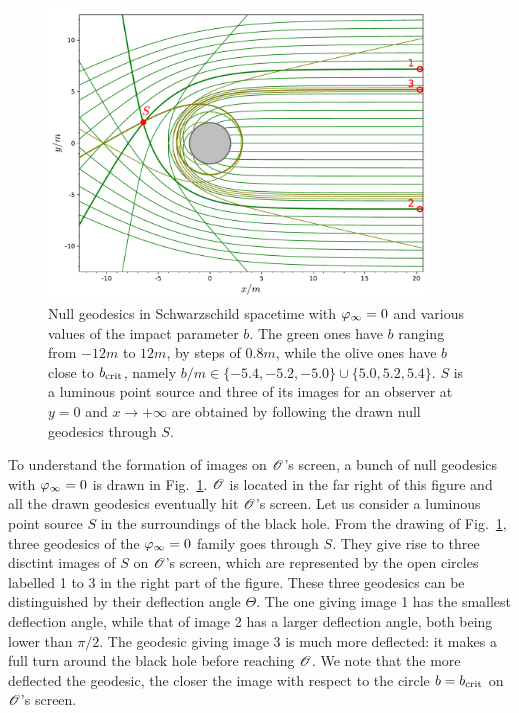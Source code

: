 \begin{figure}
\centerline{\includegraphics[width=0.9\textwidth]{ges_mult_images.pdf}}
\caption[]{\label{f:gis:mult_images} \footnotesize
Null geodesics in Schwarzschild spacetime with $\varphi_\infty=0$ and various values of the impact parameter $b$.
The green ones have $b$ ranging from $-12 m$ to $12 m$, by steps of
$0.8 m$, while the olive ones have $b$ close to $b_{\rm crit}$,
namely $b/m\in\{-5.4,-5.2,-5.0\} \cup \{5.0, 5.2, 5.4\}$. $S$ is a luminous point source
and three of its images for an observer at $y=0$ and $x\to + \infty$ are obtained by
following the drawn null geodesics through $S$.}
\end{figure}

To understand the formation of images on $\mathscr{O}$'s screen, a bunch of null
geodesics with $\varphi_\infty=0$ is drawn in Fig.~\ref{f:gis:mult_images}.
$\mathscr{O}$ is located in the far right of this figure and
all the drawn geodesics eventually hit $\mathscr{O}$'s screen. Let us consider a luminous point source
$S$ in the surroundings of the black hole. From the drawing of Fig.~\ref{f:gis:mult_images},
three geodesics of the $\varphi_\infty=0$ family goes through $S$. They give rise to
three disctint images of $S$ on $\mathscr{O}$'s screen, which are represented by the
open circles labelled 1 to 3 in the right part of the figure. These three
geodesics can be distinguished by their deflection angle $\Theta$.
The one giving image 1 has the smallest deflection angle, while that
of image 2 has a larger deflection angle, both being lower than $\pi/2$.
The geodesic giving image 3 is much more deflected: it makes a full turn around
the black hole before reaching $\mathscr{O}$. We note that the more deflected the geodesic,
the closer the image with respect to the circle $b = b_{\rm crit}$ on $\mathscr{O}$'s
screen.

